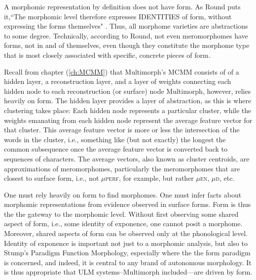 A morphomic representation by definition does not have form.
As Round puts it,``The morphomic level 
therefore expresses IDENTITIES of form, without 
expressing the forms themselves" \citep[][pp.220-221]{round:2011}.
Thus, all morphome varieties are abstractions to some degree. 
Technically, according to Round, not even 
meromorphomes have forms, not in and 
of themselves, even though they constitute the 
morphome type that is most closely associated with specific, concrete pieces of form. 

Recall from chapter (\ref{ch:MCMM}) that Multimorph's \ac{MCMM} consists of
of a hidden layer, a reconstruction layer, and a layer of
weights connecting each hidden node to each reconstruction (or surface) node
Multimorph, however, relies heavily on form. The hidden 
layer provides a layer of abstraction, as this is where 
clustering takes place: Each hidden node represents 
a particular cluster, while the weights emanating from
each hidden node represent the average feature vector for that
cluster. This average feature vector is more or less the intersection
of the words in the cluster, i.e., something like (but not exactly) 
the longest the common subsequence once the average feature vector
is converted back to sequences of characters. The average vectors, also known as
cluster centroids, are approximations of meromorphomes, 
particularly the meromorphomes
that are closest to surface form, i.e., not $\mu${\textsc{perf}}, 
for example,
but rather $\mu${\textsc{en}},
$\mu${\textsc{d}}, etc.


One must rely heavily on form to find morphomes. One must infer facts 
about morphomic representations
from evidence observed in surface forms. Form is thus the 
the gateway to the morphomic level. Without first observing 
some shared 
aspect of form, i.e., some identity of exponence, one cannot posit 
a morphome. Moreover, shared 
aspects of form can be observed only at the phonological level.
Identity of exponence is important not just to a morphomic analysis,
but also to Stump's Paradigm Function Morphology, especially where the 
the form paradigm is concerned, and indeed, it is central to any 
brand of autonomous morphology. It is thus appropriate that \ac{ULM}  systems--Multimorph
included---are driven by form.

